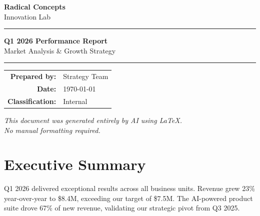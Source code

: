 \documentclass[11pt,a4paper]{article}
\begin{document}
\begin{titlepage}
\centering
\vspace*{3cm}

{\Huge\textbf{\textcolor{brand}{Radical Concepts}}}\\[0.5cm]
{\Large\textcolor{accent}{Innovation Lab}}

\vspace{2cm}
\rule{\textwidth}{1pt}
\vspace{0.5cm}

{\LARGE\textbf{Q1 2026 Performance Report}}\\[0.3cm]
{\large Market Analysis \& Growth Strategy}

\vspace{0.5cm}
\rule{\textwidth}{1pt}

\vspace{3cm}

\begin{tabular}{rl}
\textbf{Prepared by:} & Strategy Team \\
\textbf{Date:} & \today \\
\textbf{Classification:} & Internal \\
\end{tabular}

\vfill
{\small\textit{This document was generated entirely by AI using LaTeX.\\No manual formatting required.}}
\end{titlepage}

\tableofcontents
\newpage

\section{Executive Summary}

Q1 2026 delivered exceptional results across all business units. Revenue grew 23\% year-over-year to \$8.4M, exceeding our target of \$7.5M. The AI-powered product suite drove 67\% of new revenue, validating our strategic pivot from Q3 2025.

\begin{center}
\end{center}
\end{document}

